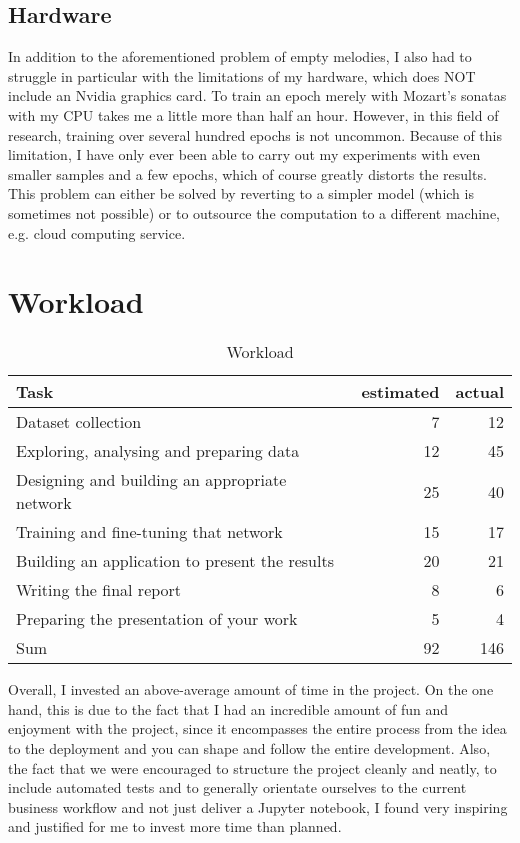 \documentclass[a4paper, 10pt, xcolor=dvipsnames]{article} %
\begin{document}
\subsection{Hardware}
In addition to the aforementioned problem of empty melodies, I also had to
struggle in particular with the limitations of my hardware, which does NOT
include an Nvidia graphics card. To train an epoch merely with Mozart's sonatas
with my CPU takes me a little more than half an hour. However, in this field of
research, training over several hundred epochs is not uncommon. Because of this
limitation, I have only ever been able to carry out my experiments with even
smaller samples and a few epochs, which of course greatly distorts the results.
This problem can either be solved by reverting to a simpler model (which is
sometimes not possible) or to outsource the computation to a different machine,
e.g. cloud computing service.


\section{Workload}
\begin{table}[!h]
  \begin{center}
    \begin{tabular}{lrr}
      Task                                           & estimated & actual \\
      \hline
      \hline
      Dataset collection                             & 7         & 12     \\
      Exploring, analysing and preparing data        & 12        & 45     \\
      Designing and building an appropriate network  & 25        & 40     \\
      Training and fine-tuning that network          & 15        & 17     \\
      Building an application to present the results & 20        & 21     \\
      Writing the final report                       & 8         & 6      \\
      Preparing the presentation of your work        & 5         & 4      \\
      \hline
      Sum                                            & 92        & 146
    \end{tabular}
    \caption{Workload}
  \end{center}
\end{table}

Overall, I invested an above-average amount of time in the project. On the one
hand, this is due to the fact that I had an incredible amount of fun and
enjoyment with the project, since it encompasses the entire process from the
idea to the deployment and you can shape and follow the entire development.
Also, the fact that we were encouraged to structure the project cleanly and
neatly, to include automated tests and to generally orientate ourselves to the
current business workflow and not just deliver a Jupyter notebook, I found very
inspiring and justified for me to invest more time than planned.
\end{document}
